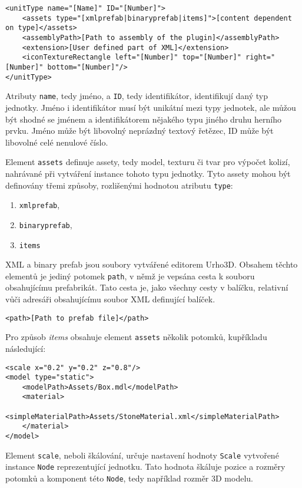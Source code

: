 \begin{lstlisting}
<unitType name="[Name]" ID="[Number]">
	<assets type="[xmlprefab|binaryprefab|items]">[content dependent on type]</assets>
	<assemblyPath>[Path to assembly of the plugin]</assemblyPath>
	<extension>[User defined part of XML]</extension>
	<iconTextureRectangle left="[Number]" top="[Number]" right="[Number]" bottom="[Number]"/>
</unitType>
\end{lstlisting}

Atributy \texttt{name}, tedy jméno, a \texttt{ID}, tedy identifikátor, identifikují daný typ jednotky. Jméno i identifikátor musí být unikátní mezi typy jednotek, ale můžou být shodné se jménem a identifikátorem nějakého typu jiného druhu herního prvku. Jméno může být libovolný neprázdný textový řetězec, ID může být libovolné celé nenulové číslo.

Element \texttt{assets} definuje assety, tedy model, texturu či tvar pro výpočet kolizí, nahrávané při vytváření instance tohoto typu jednotky. Tyto assety mohou být definovány třemi způsoby, rozlišenými hodnotou atributu \texttt{type}:

\begin{enumerate}
	\item \texttt{xmlprefab},
	\item \texttt{binaryprefab},
	\item \texttt{items}
\end{enumerate}

XML a binary prefab jsou soubory vytvářené editorem Urho3D. Obsahem těchto elementů je jediný potomek \texttt{path}, v němž je vepsána cesta k souboru obsahujícímu prefabrikát. Tato cesta je, jako všechny cesty v balíčku, relativní vůči adresáři obsahujícímu soubor XML definující balíček.
\begin{lstlisting}
<path>[Path to prefab file]</path>
\end{lstlisting}

Pro způsob \textit{items} obsahuje element \texttt{assets} několik potomků, kupříkladu následující:
\begin{lstlisting}
<scale x="0.2" y="0.2" z="0.8"/>
<model type="static">
	<modelPath>Assets/Box.mdl</modelPath>
	<material>
		<simpleMaterialPath>Assets/StoneMaterial.xml</simpleMaterialPath>
	</material>
</model>
\end{lstlisting}
Element \texttt{scale}, neboli škálování, určuje nastavení hodnoty \texttt{Scale} vytvořené instance \texttt{Node} reprezentující jednotku. Tato hodnota škáluje pozice a rozměry potomků a komponent této \texttt{Node}, tedy například rozměr 3D modelu. 

